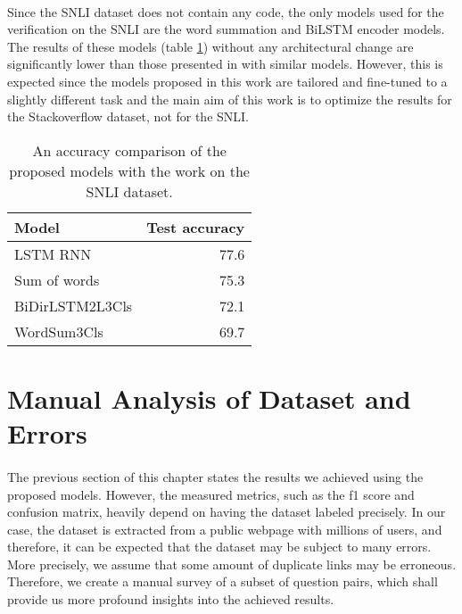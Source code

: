 \paragraph{}
Since the SNLI dataset does not contain any code, the only models used for the verification on the SNLI are the word summation and BiLSTM encoder models. The results of these models (table \ref{models_vs_snli}) without any architectural change are significantly lower than those presented in \cite{snli} with similar models. However, this is expected since the models proposed in this work are tailored and fine-tuned to a slightly different task and the main aim of this work is to optimize the results for the Stackoverflow dataset, not for the SNLI.

\begin{table}
	\centering
	\begin{tabular}{lr} 
		\hline
		\textbf{Model}          & \multicolumn{1}{l}{\textbf{Test accuracy}}  \\ 
		\hline\hline
		LSTM RNN \cite{snli}    & 77.6                              \\
		Sum of words \cite{snli}& 75.3                              \\
		BiDirLSTM2L3Cls        & 72.1                               \\
		WordSum3Cls            & 69.7                               \\
		\hline
	\end{tabular}
	\caption{An accuracy comparison of the proposed models with the work \cite{snli} on the SNLI dataset.}
	\label{models_vs_snli}
\end{table}


\section{Manual Analysis of Dataset and Errors}\label{analysis_of_dataset_and_errors}
\paragraph{}
The previous section of this chapter states the results we achieved using the proposed models. However, the measured metrics,  such as the f1 score and confusion matrix, heavily depend on having the dataset labeled precisely. In our case, the dataset is extracted from a public webpage with millions of users, and therefore, it can be expected that the dataset may be subject to many errors. More precisely, we assume that some amount of duplicate links may be erroneous. Therefore, we create a manual survey of a subset of question pairs, which shall provide us more profound insights into the achieved results.

